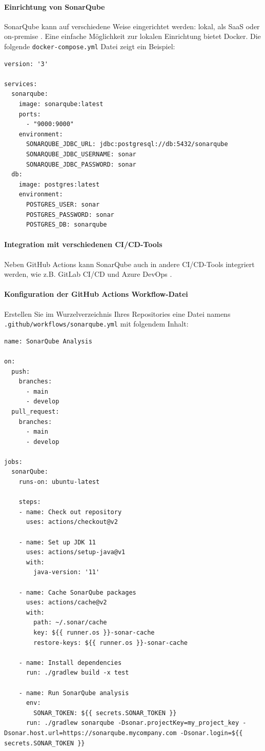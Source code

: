\paragraph{Einrichtung von SonarQube}

SonarQube kann auf verschiedene Weise eingerichtet werden: lokal, als SaaS oder on-premise \cite{SonarSource2021a}. Eine einfache Möglichkeit zur lokalen Einrichtung bietet Docker. Die folgende \texttt{docker-compose.yml} Datei zeigt ein Beispiel:

\begin{lstlisting}
version: '3'

services:
  sonarqube:
    image: sonarqube:latest
    ports:
      - "9000:9000"
    environment:
      SONARQUBE_JDBC_URL: jdbc:postgresql://db:5432/sonarqube
      SONARQUBE_JDBC_USERNAME: sonar
      SONARQUBE_JDBC_PASSWORD: sonar
  db:
    image: postgres:latest
    environment:
      POSTGRES_USER: sonar
      POSTGRES_PASSWORD: sonar
      POSTGRES_DB: sonarqube
\end{lstlisting}

\paragraph{Integration mit verschiedenen CI/CD-Tools}

Neben GitHub Actions kann SonarQube auch in andere CI/CD-Tools integriert werden, wie z.B. GitLab CI/CD und Azure DevOps \cite{SonarSource2023}.

\paragraph{Konfiguration der GitHub Actions Workflow-Datei}

Erstellen Sie im Wurzelverzeichnis Ihres Repositories eine Datei namens \texttt{.github/workflows/sonarqube.yml} mit folgendem Inhalt:

\begin{lstlisting}
name: SonarQube Analysis

on:
  push:
    branches:
      - main
      - develop
  pull_request:
    branches:
      - main
      - develop

jobs:
  sonarQube:
    runs-on: ubuntu-latest

    steps:
    - name: Check out repository
      uses: actions/checkout@v2

    - name: Set up JDK 11
      uses: actions/setup-java@v1
      with:
        java-version: '11'

    - name: Cache SonarQube packages
      uses: actions/cache@v2
      with:
        path: ~/.sonar/cache
        key: ${{ runner.os }}-sonar-cache
        restore-keys: ${{ runner.os }}-sonar-cache

    - name: Install dependencies
      run: ./gradlew build -x test

    - name: Run SonarQube analysis
      env:
        SONAR_TOKEN: ${{ secrets.SONAR_TOKEN }}
      run: ./gradlew sonarqube -Dsonar.projectKey=my_project_key -Dsonar.host.url=https://sonarqube.mycompany.com -Dsonar.login=${{ secrets.SONAR_TOKEN }}
\end{lstlisting}


